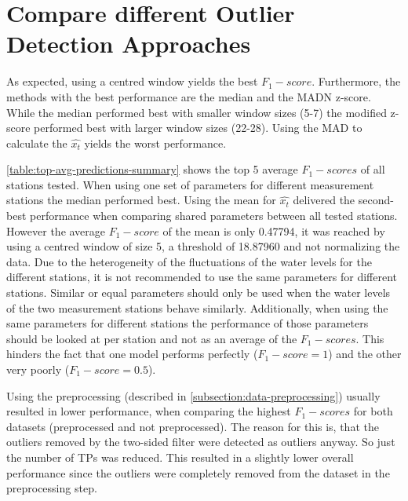 \section{Compare different Outlier Detection Approaches}
As expected, using a centred window yields the best $F_1-score$. Furthermore, the methods with the best performance are the median and the \ac{MADN} z-score. While the median performed best with smaller window sizes (5-7) the modified z-score performed best with larger window sizes (22-28). Using the \ac{MAD} to calculate the $\hat{x_t}$ yields the worst performance.
\par
\autoref{table:top-avg-predictions-summary} shows the top 5 average $F_1-scores$ of all stations tested. When using one set of parameters for different measurement stations the median performed best. Using the mean for $\hat{x_t}$ delivered the second-best performance when comparing shared parameters between all tested stations. However the average $F_1-score$ of the mean is only 0.47794, it was reached by using a centred window of size 5, a threshold of 18.87960 and not normalizing the data. Due to the heterogeneity of the fluctuations of the water levels for the different stations, it is not recommended to use the same parameters for different stations. Similar or equal parameters should only be used when the water levels of the two measurement stations behave similarly. Additionally, when using the same parameters for different stations the performance of those parameters should be looked at per station and not as an average of the  $F_1-scores$. This hinders the fact that one model performs perfectly ($F_1-score = 1$) and the other very poorly ($F_1-score = 0.5$). 

\par
Using the preprocessing (described in \autoref{subsection:data-preprocessing}) usually resulted in lower performance, when comparing the highest $F_1-scores$ for both datasets (preprocessed and not preprocessed). The reason for this is, that the outliers removed by the two-sided filter were detected as outliers anyway. So just the number of \acp{TP} was reduced. This resulted in a slightly lower overall performance since the outliers were completely removed from the dataset in the preprocessing step.

